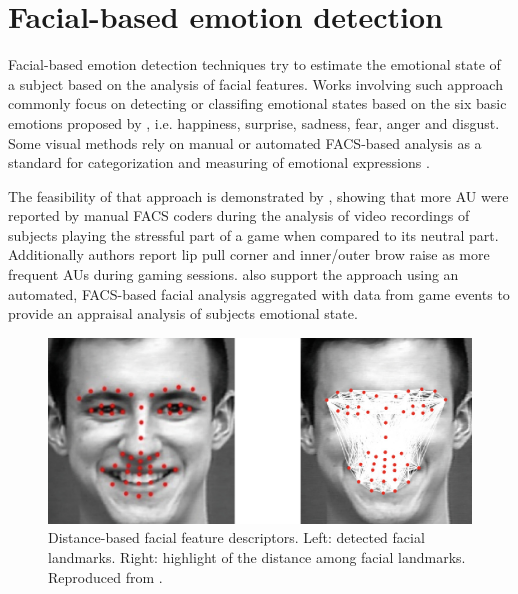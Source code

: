 \section{Facial-based emotion detection}
\label{ch:literature-face-emotion-detection}

Facial-based emotion detection techniques try to estimate the emotional state of a subject based on the analysis of facial features. Works involving such approach commonly focus on detecting or classifing emotional states based on the six basic emotions proposed by \textcite{ekman1971constants}, i.e. happiness, surprise, sadness, fear, anger and disgust. Some visual methods rely on manual or automated FACS-based analysis as a standard for categorization and measuring of emotional expressions \parencite{bartlett1999measuring}.

The feasibility of that approach is demonstrated by \textcite{kaiser1994multi}, showing that more AU were reported by manual FACS coders during the analysis of video recordings of subjects playing the stressful part of a game when compared to its neutral part. Additionally authors report lip pull corner and inner/outer brow raise as more frequent AUs during gaming sessions. \textcite{wehrle2000emotion} also support the approach using an automated, FACS-based facial analysis aggregated with data from game events to provide an appraisal analysis of subjects emotional state.

\begin{figure}[h]
    \centering
    \includegraphics[width=1.0\linewidth]{figures/samara2016sensing-distances.png}
    \caption{Distance-based facial feature descriptors. Left: detected facial landmarks. Right: highlight of the distance among facial landmarks. Reproduced from \textcite{samara2016sensing}.}
    \label{fig:distance-samara}
\end{figure}

